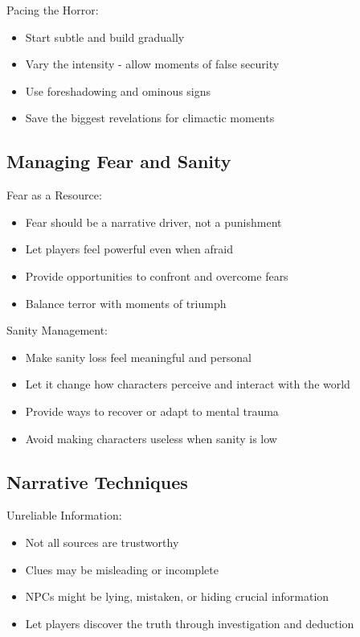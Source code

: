\documentclass[11pt]{article}
\begin{document}
Pacing the Horror:
\begin{itemize}
\item Start subtle and build gradually
\item Vary the intensity - allow moments of false security
\item Use foreshadowing and ominous signs
\item Save the biggest revelations for climactic moments
\end{itemize}

\subsection{Managing Fear and Sanity}

Fear as a Resource:
\begin{itemize}
\item Fear should be a narrative driver, not a punishment
\item Let players feel powerful even when afraid
\item Provide opportunities to confront and overcome fears
\item Balance terror with moments of triumph
\end{itemize}

Sanity Management:
\begin{itemize}
\item Make sanity loss feel meaningful and personal
\item Let it change how characters perceive and interact with the world
\item Provide ways to recover or adapt to mental trauma
\item Avoid making characters useless when sanity is low
\end{itemize}

\subsection{Narrative Techniques}

Unreliable Information:
\begin{itemize}
\item Not all sources are trustworthy
\item Clues may be misleading or incomplete
\item NPCs might be lying, mistaken, or hiding crucial information
\item Let players discover the truth through investigation and deduction
\end{itemize}
\end{document}
